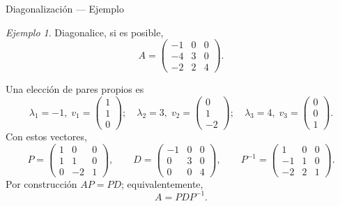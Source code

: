 \documentclass[aspectratio=169,11pt]{beamer}
\theoremstyle{remark}
\newtheorem{Ejem}[definicion]{Ejemplo}
\begin{document}
\begin{frame}[shrink=5]{Diagonalización — Ejemplo}
\footnotesize
\begin{Ejem}


Diagonalice, si es posible,
\[
A=\begin{pmatrix}-1 & 0 & 0\\-4 & 3 & 0\\-2 & 2 & 4\end{pmatrix}.
\]

\scriptsize
Una elección de pares propios es
\[
\lambda_1=-1,\;v_1=\begin{pmatrix}1\\1\\0\end{pmatrix};\quad \lambda_2=3,\;v_2=\begin{pmatrix}0\\1\\-2\end{pmatrix};\quad \lambda_3=4,\;v_3=\begin{pmatrix}0\\0\\1\end{pmatrix}.
\]
Con estos vectores,
\[
P=\begin{pmatrix}1 & 0 & 0\\1 & 1 & 0\\0 & -2 & 1\end{pmatrix},\qquad D=\begin{pmatrix}-1 & 0 & 0\\0 & 3 & 0\\0 & 0 & 4\end{pmatrix},\qquad P^{-1}=\begin{pmatrix}1 & 0 & 0\\-1 & 1 & 0\\-2 & 2 & 1\end{pmatrix}.
\]
Por construcción $AP=PD$; equivalentemente,
\[
\boxed{A=PDP^{-1}}.
\]

\end{Ejem}
\end{frame}
\end{document}

